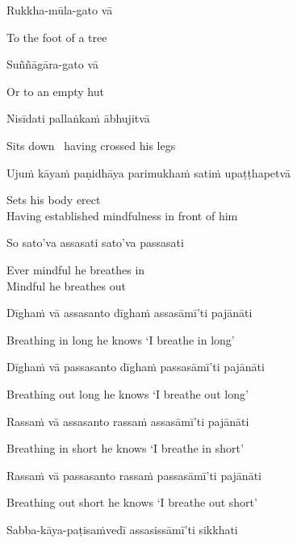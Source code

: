 Rukkha-mūla-gato vā

\begin{english}
  To the foot of a tree
\end{english}

Suññāgāra-gato vā

\begin{english}
  Or to an empty hut
\end{english}

Nisīdati pallaṅkaṁ ābhujitvā

\begin{english}
  Sits down \breathmark\ having crossed his legs
\end{english}

Ujuṁ kāyaṁ paṇidhāya parimukhaṁ satiṁ upaṭṭhapetvā

\begin{english}
  Sets his body erect\\
  Having established mindfulness in front of him
\end{english}

So sato'va assasati sato'va passasati

\begin{english}
  Ever mindful he breathes in\\
  Mindful he breathes out
\end{english}

Dīghaṁ vā assasanto dīghaṁ assasāmī'ti pajānāti

\begin{english}
  Breathing in long he knows `I breathe in long'
\end{english}

Dīghaṁ vā passasanto dīghaṁ passasāmī'ti pajānāti

\begin{english}
  Breathing out long he knows `I breathe out long'
\end{english}

Rassaṁ vā assasanto rassaṁ assasāmī'ti pajānāti

\begin{english}
  Breathing in short he knows `I breathe in short'
\end{english}

Rassaṁ vā passasanto rassaṁ passasāmī'ti pajānāti

\begin{english}
  Breathing out short he knows `I breathe out short'
\end{english}

Sabba-kāya-paṭisaṁvedī assasissāmī'ti sikkhati

